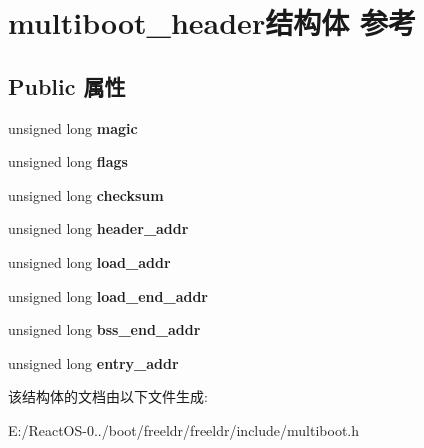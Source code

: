 \hypertarget{structmultiboot__header}{}\section{multiboot\+\_\+header结构体 参考}
\label{structmultiboot__header}
\subsection*{Public 属性}
\begin{DoxyCompactItemize}
\item 
\mbox{\label{structmultiboot__header_ad685c9fda952c9ce602f530e5270eb6b}} 
unsigned long {\bfseries magic}
\item 
\mbox{\label{structmultiboot__header_a323f1b9b81159e684a851402f0c75381}} 
unsigned long {\bfseries flags}
\item 
\mbox{\label{structmultiboot__header_ae820d9c140123e01b6f8a3a39c69851f}} 
unsigned long {\bfseries checksum}
\item 
\mbox{\label{structmultiboot__header_a8a3d459775596f92e50b36bc2018ea7a}} 
unsigned long {\bfseries header\+\_\+addr}
\item 
\mbox{\label{structmultiboot__header_a5ccde6f22ea2a602f0e9e5c08740f831}} 
unsigned long {\bfseries load\+\_\+addr}
\item 
\mbox{\label{structmultiboot__header_abf9d70f5dace001e3460dcf779ef6876}} 
unsigned long {\bfseries load\+\_\+end\+\_\+addr}
\item 
\mbox{\label{structmultiboot__header_a53eb04681217e6c771486b8adb4c8265}} 
unsigned long {\bfseries bss\+\_\+end\+\_\+addr}
\item 
\mbox{\label{structmultiboot__header_a3581a47c4ab86b54fb9f051ed1ed4bb0}} 
unsigned long {\bfseries entry\+\_\+addr}
\end{DoxyCompactItemize}


该结构体的文档由以下文件生成\+:\begin{DoxyCompactItemize}
\item 
E\+:/\+React\+O\+S-\/0../boot/freeldr/freeldr/include/multiboot.\+h\end{DoxyCompactItemize}
